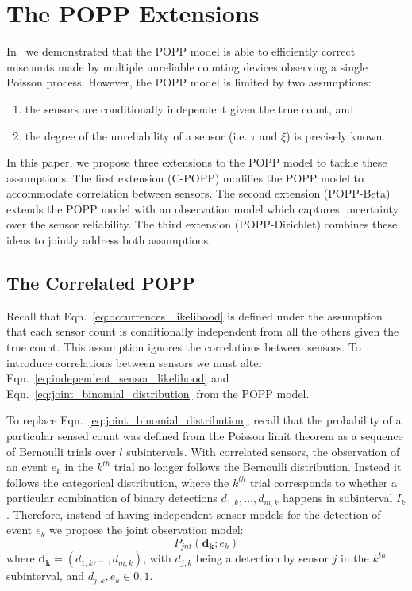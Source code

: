 
\section{The POPP Extensions}
\label{sec:popp_extensions}

In~\cite{jovan18a} we demonstrated that the POPP model is able to efficiently correct miscounts made by multiple unreliable counting devices observing a single Poisson process. However, the POPP model is limited by two assumptions:
\begin{enumerate}
    \item the sensors are conditionally independent given the true count, and 
    \item the degree of the unreliability of a sensor (i.e. $\tau$ and $\xi$) is precisely known.
\end{enumerate}
In this paper, we propose three extensions to the POPP model to tackle these assumptions. The first extension (C-POPP) modifies the POPP model to accommodate correlation between sensors. The second extension (POPP-Beta) extends the POPP model with an observation model which captures uncertainty over the sensor reliability. The third extension (POPP-Dirichlet) combines these ideas to jointly address both assumptions. 

\subsection{The Correlated POPP}
\label{subsec:cpop}

Recall that Eqn.~\ref{eq:occurrences_likelihood} is defined under the assumption that each sensor count is conditionally independent from all the others given the true count. This assumption ignores the correlations between sensors. 
% 
To introduce correlations between sensors we must alter Eqn.~\ref{eq:independent_sensor_likelihood} and
Eqn.~\ref{eq:joint_binomial_distribution} from the POPP model.


To replace Eqn.~\ref{eq:joint_binomial_distribution}, recall that the probability of a particular sensed count was defined from the Poisson limit theorem as a sequence of Bernoulli trials over $l$ subintervals.
% 
With correlated sensors, the observation of an event $e_k$ in the 
$k^{th}$ trial no longer follows the Bernoulli distribution. Instead it follows the categorical distribution, where the $k^{th}$ trial corresponds to whether a particular combination of binary detections $d_{1,k}, \ldots, d_{m,k}$ happens in subinterval $I_k$. Therefore, instead of having independent sensor models for the detection of event $e_k$ we propose the joint observation model:
\begin{equation}
    \label{eq:joint_sensor_model}
    P_{jnt}(\mathbf{d_k} ; e_k)
\end{equation}    
\noindent where $ \mathbf{d_k} = (d_{1,k}, \ldots, d_{m,k})$, with $d_{j,k}$ being a detection by sensor $j$ in the $k^{th}$ subinterval, and $d_{j,k}, e_k \in {0, 1}$. 

